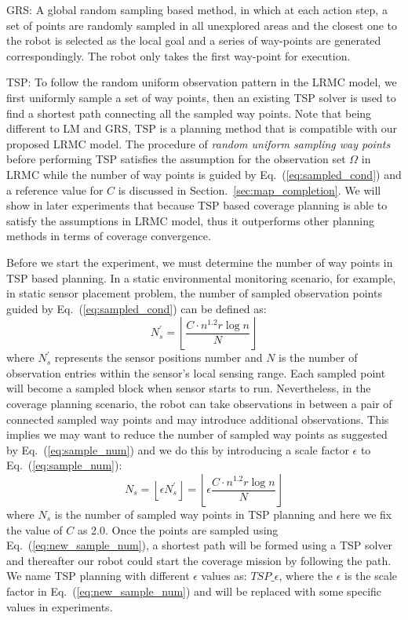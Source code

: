 GRS: A global random sampling based method, in which at each action step, a set of points are randomly sampled in all unexplored areas and the closest one to the robot is selected as the local goal and a series of way-points are generated correspondingly. The robot only takes the first way-point for execution.

TSP: To follow the random uniform observation pattern in the LRMC model, we first uniformly sample a set of way points, then an existing TSP solver is used to find a shortest path connecting all the sampled way points. Note that being different to LM and GRS, TSP is a planning method that is compatible with our proposed LRMC model. The procedure of \textit{random uniform sampling way points} before performing TSP satisfies the assumption for the observation set $\Omega$ in LRMC while the number of way points is guided by Eq.~(\ref{eq:sampled_cond}) and a reference value for $C$ is discussed in Section.~\ref{sec:map_completion}. We will show in later experiments that because TSP based coverage planning is able to satisfy the assumptions in LRMC model, thus it outperforms other planning methods in terms of coverage convergence.

Before we start the experiment, we must determine the number of way points in TSP based planning. In a static environmental monitoring scenario, for example, in static sensor placement problem, the number of sampled observation points guided by Eq.~(\ref{eq:sampled_cond}) can be defined as:
\begin{equation}
    \label{eq:sample_num}
    N^{'}_{s} = \left \lfloor \frac{C\cdot n^{1.2}r\log n}{N} \right \rfloor
\end{equation}
where $N^{'}_{s}$ represents the sensor positions number and $N$ is the number of observation entries within the sensor's local sensing range. Each sampled point will become a sampled block when sensor starts to run. Nevertheless, in the coverage planning scenario, the robot can take observations in between a pair of connected sampled way points and may introduce additional observations. This implies we may want to reduce the number of sampled way points as suggested by Eq.~(\ref{eq:sample_num}) and we do this by introducing a scale factor $\epsilon$ to Eq.~(\ref{eq:sample_num}):
\begin{equation}
    \label{eq:new_sample_num}
    N_{s} = \left \lfloor \epsilon N^{'}_{s} \right \rfloor = \left \lfloor \epsilon \frac{C\cdot n^{1.2}r\log n}{N} \right \rfloor
\end{equation}
where $N_{s}$ is the number of sampled way points in TSP planning and here we fix the value of $C$ as 2.0. Once the points are sampled using Eq.~(\ref{eq:new_sample_num}), a shortest path will be formed using a TSP solver and thereafter our robot could start the coverage mission by following the path. We name TSP planning with different $\epsilon$ values as: $TSP\_\epsilon$, where the $\epsilon$ is the scale factor in Eq.~(\ref{eq:new_sample_num}) and will be replaced with some specific values in experiments.

